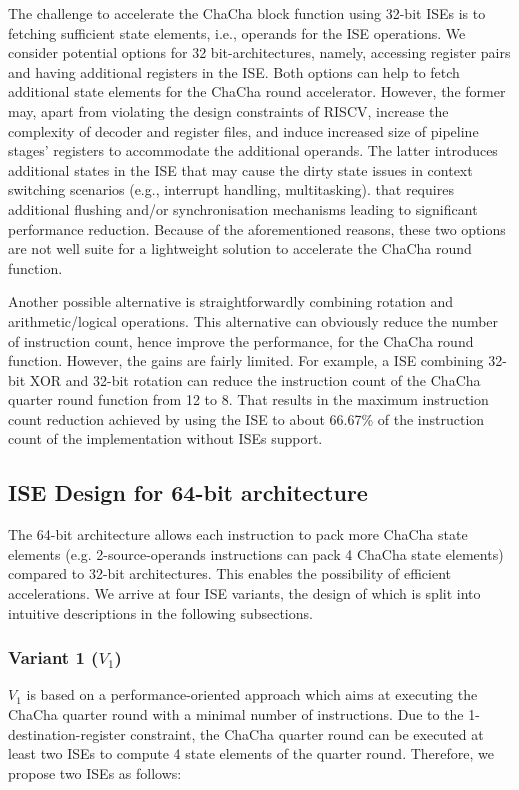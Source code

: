 The challenge to accelerate the ChaCha block function using 32-bit ISEs is to fetching sufficient state elements, i.e., operands for the ISE operations.
We consider potential options for 32 bit-architectures, namely, accessing register pairs and having additional registers in the ISE.
Both options can help to fetch additional state elements for the ChaCha round accelerator. 
However, the former may, apart from violating the design constraints of RISCV, 
increase the complexity of decoder and register files, and 
induce increased size of pipeline stages' registers to accommodate the additional operands.
The latter introduces additional states in the ISE that may cause the dirty state issues in context switching scenarios (e.g., interrupt handling, multitasking).
that requires additional flushing and/or synchronisation mechanisms leading to significant performance reduction.
Because of the aforementioned reasons, these two options are not well suite for a lightweight solution to accelerate the ChaCha round function.

Another possible alternative is straightforwardly combining rotation and arithmetic/logical operations. 
This alternative can obviously reduce the number of instruction count, hence improve the performance, for the ChaCha round function.
However, the gains are fairly limited. 
For example, a ISE combining 32-bit XOR and 32-bit rotation can reduce the instruction count of the ChaCha quarter round function from 
12 to 8. 
That results in the maximum instruction count reduction achieved by using the ISE to about 66.67\% of the instruction count of the implementation without ISEs support.

\subsection{ISE Design for 64-bit architecture}
The 64-bit architecture allows each instruction to pack more ChaCha state elements (e.g. 2-source-operands instructions can pack 4 ChaCha state elements) compared to 32-bit architectures. 
This enables the possibility of efficient accelerations.
We arrive at four ISE variants, the design of which is split into intuitive descriptions in the following subsections. 

\subsubsection{Variant 1 ($V_1$)}
$V_1$ is based on a performance-oriented approach which aims at executing the ChaCha quarter round with a minimal number of instructions.
Due to the 1-destination-register constraint, the ChaCha quarter round can be executed at least two ISEs to compute 4 state elements of the quarter round.
Therefore, we propose two ISEs as follows:

